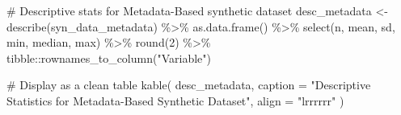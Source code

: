 \documentclass[
  letterpaper,
  DIV=11,
  numbers=noendperiod]{scrartcl}
\newenvironment{Shaded}{\begin{snugshade}}{\end{snugshade}}
\newcommand{\AttributeTok}[1]{\textcolor[rgb]{0.40,0.45,0.13}{#1}}
\newcommand{\CommentTok}[1]{\textcolor[rgb]{0.37,0.37,0.37}{#1}}
\newcommand{\DecValTok}[1]{\textcolor[rgb]{0.68,0.00,0.00}{#1}}
\newcommand{\FunctionTok}[1]{\textcolor[rgb]{0.28,0.35,0.67}{#1}}
\newcommand{\NormalTok}[1]{\textcolor[rgb]{0.00,0.23,0.31}{#1}}
\newcommand{\OtherTok}[1]{\textcolor[rgb]{0.00,0.23,0.31}{#1}}
\newcommand{\SpecialCharTok}[1]{\textcolor[rgb]{0.37,0.37,0.37}{#1}}
\newcommand{\StringTok}[1]{\textcolor[rgb]{0.13,0.47,0.30}{#1}}
\begin{document}
\begin{Shaded}
\begin{Highlighting}[]
\CommentTok{\# Descriptive stats for Metadata{-}Based synthetic dataset}
\NormalTok{desc\_metadata }\OtherTok{\textless{}{-}} \FunctionTok{describe}\NormalTok{(syn\_data\_metadata) }\SpecialCharTok{\%\textgreater{}\%}
  \FunctionTok{as.data.frame}\NormalTok{() }\SpecialCharTok{\%\textgreater{}\%}
  \FunctionTok{select}\NormalTok{(n, mean, sd, min, median, max) }\SpecialCharTok{\%\textgreater{}\%}
  \FunctionTok{round}\NormalTok{(}\DecValTok{2}\NormalTok{) }\SpecialCharTok{\%\textgreater{}\%}
\NormalTok{  tibble}\SpecialCharTok{::}\FunctionTok{rownames\_to\_column}\NormalTok{(}\StringTok{"Variable"}\NormalTok{)}

\CommentTok{\# Display as a clean table}
\FunctionTok{kable}\NormalTok{(}
\NormalTok{  desc\_metadata,}
  \AttributeTok{caption =} \StringTok{"Descriptive Statistics for Metadata{-}Based Synthetic Dataset"}\NormalTok{,}
  \AttributeTok{align =} \StringTok{"lrrrrrr"}
\NormalTok{)}
\end{Highlighting}
\end{Shaded}
\end{document}

